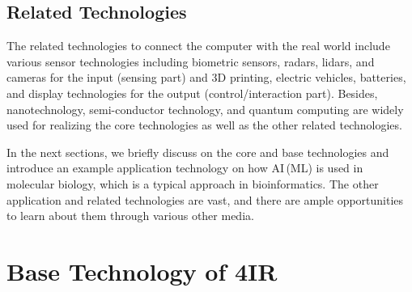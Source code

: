 \documentclass[11pt]{article}
\begin{document}
\subsection{Related Technologies}
The related technologies to connect the computer with the real world include various sensor technologies including biometric sensors, radars, lidars, and cameras for the input (sensing part) and 3D printing, electric vehicles, batteries, and display technologies for the output (control/interaction part). Besides, nanotechnology, semi-conductor technology, and quantum computing are widely used for realizing the core technologies as well as the other related technologies. 

In the next sections, we briefly discuss on the core and base technologies and introduce an example application technology on how AI\,(ML) is used in molecular biology, which is a typical approach in bioinformatics. The other application and related technologies are vast, and there are ample opportunities to learn about them through various other media.



\section{Base Technology of 4IR}
\end{document}
